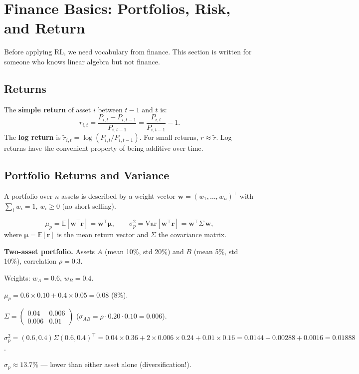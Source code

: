 \documentclass[12pt,a4paper]{article}
\begin{document}
\section{Finance Basics: Portfolios, Risk, and Return}

\begin{insbox}
Before applying RL, we need vocabulary from finance.  This section is
written for someone who knows linear algebra but not finance.
\end{insbox}

\subsection{Returns}

The \textbf{simple return} of asset $i$ between $t-1$ and $t$ is:
\begin{equation}
  r_{i,t} = \frac{P_{i,t} - P_{i,t-1}}{P_{i,t-1}} = \frac{P_{i,t}}{P_{i,t-1}} - 1.
\end{equation}
The \textbf{log return} is $\tilde{r}_{i,t} = \log(P_{i,t}/P_{i,t-1})$.
For small returns, $r \approx \tilde{r}$.  Log returns have the convenient
property of being additive over time.

\subsection{Portfolio Returns and Variance}

A portfolio over $n$ assets is described by a weight vector
$\mathbf{w} = (w_1, \ldots, w_n)^\top$ with $\sum_i w_i = 1$,
$w_i \ge 0$ (no short selling).

\begin{equation}
  \mu_p = \mathbb{E}\!\left[\mathbf{w}^\top \mathbf{r}\right]
        = \mathbf{w}^\top \boldsymbol{\mu}, \qquad
  \sigma_p^2 = \text{Var}\!\left[\mathbf{w}^\top \mathbf{r}\right]
             = \mathbf{w}^\top \Sigma\, \mathbf{w},
\end{equation}
where $\boldsymbol{\mu} = \mathbb{E}[\mathbf{r}]$ is the mean return vector
and $\Sigma$ the covariance matrix.

\begin{exbox}
\textbf{Two-asset portfolio.}
Assets $A$ (mean 10\%, std 20\%) and $B$ (mean 5\%, std 10\%),
correlation $\rho = 0.3$.

Weights: $w_A = 0.6$, $w_B = 0.4$.

$\mu_p = 0.6 \times 0.10 + 0.4 \times 0.05 = 0.08$ (8\%).

$\Sigma = \begin{pmatrix} 0.04 & 0.006 \\ 0.006 & 0.01 \end{pmatrix}$
($\sigma_{AB} = \rho \cdot 0.20 \cdot 0.10 = 0.006$).

$\sigma_p^2 = (0.6, 0.4)\Sigma(0.6, 0.4)^\top
= 0.04 \times 0.36 + 2 \times 0.006 \times 0.24 + 0.01 \times 0.16
= 0.0144 + 0.00288 + 0.0016 = 0.01888$.

$\sigma_p \approx 13.7\%$ --- lower than either asset alone (diversification!).
\end{exbox}
\end{document}
